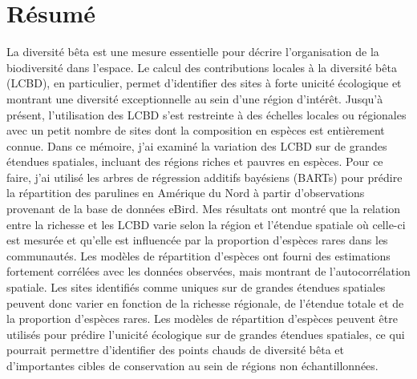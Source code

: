 \documentclass[12pt,twoside,maitrise]{dms}
\numberwithin{equation}{section}
\numberwithin{table}{chapter}
\numberwithin{figure}{chapter}
\begin{document}
\maketitle

\maketitle


\francais

\chapter*{Résumé}

La diversité bêta est une mesure essentielle pour décrire l'organisation de la biodiversité dans l'espace. Le calcul des contributions locales à la diversité bêta (LCBD), en particulier, permet d'identifier des sites à forte unicité écologique et montrant une diversité exceptionnelle au sein d'une région d'intérêt. Jusqu'à présent, l'utilisation des LCBD s'est restreinte à des échelles locales ou régionales avec un petit nombre de sites dont la composition en espèces est entièrement connue. Dans ce mémoire, j'ai examiné la variation des LCBD sur de grandes étendues spatiales, incluant des régions riches et pauvres en espèces. Pour ce faire, j'ai utilisé les arbres de régression additifs bayésiens (BARTs) pour prédire la répartition des parulines en Amérique du Nord à partir d'observations provenant de la base de données eBird. Mes résultats ont montré que la relation entre la richesse et les LCBD varie selon la région et l'étendue spatiale où celle-ci est mesurée et qu'elle est influencée par la proportion d'espèces rares dans les communautés. Les modèles de répartition d'espèces ont fourni des estimations fortement corrélées avec les données observées, mais montrant de l'autocorrélation spatiale. Les sites identifiés comme uniques sur de grandes étendues spatiales peuvent donc varier en fonction de la richesse régionale, de l'étendue totale et de la proportion d'espèces rares. Les modèles de répartition d'espèces peuvent être utilisés pour prédire l'unicité écologique sur de grandes étendues spatiales, ce qui pourrait permettre d'identifier des points chauds de diversité bêta et d'importantes cibles de conservation au sein de régions non échantillonnées.
\end{document}
